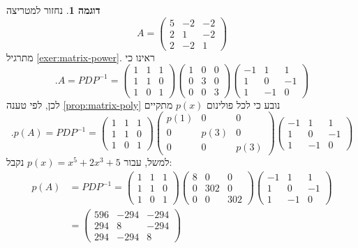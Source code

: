 \documentclass[12pt]{report}
\theoremstyle{plain}
\theoremstyle{definition}
\newtheorem{example}{דוגמה}[chapter]
\newcommand{\0}{\mathbf{0}}
\begin{document}
\begin{example}
נחזור למטריצה
$$
A=\begin{pmatrix}
5 & -2 & -2\\
2 & 1 & -2\\
2 & -2 & 1
\end{pmatrix}
$$
מתרגיל
\ref{exer:matrix-power}.
ראינו כי
$$
.A=PDP^{-1}=\begin{pmatrix}
1 & 1 & 1 \\ 
1 & 1 & 0 \\
1 & 0 & 1
\end{pmatrix}\begin{pmatrix}
1 & 0 & 0\\
0 & 3 & 0\\
0 & 0 & 3
\end{pmatrix}\begin{pmatrix}
-1 & 1 & 1\\
1 & 0 & -1\\
1 & -1 & 0
\end{pmatrix}
$$
לכן, לפי טענה
\ref{prop:matrix-poly}
נובע כי לכל פולינום
$p(x)$
מתקיים
$$
.p(A)=PDP^{-1}=\begin{pmatrix}
1 & 1 & 1 \\ 
1 & 1 & 0 \\
1 & 0 & 1
\end{pmatrix}\begin{pmatrix}
p(1) & 0 & 0\\
0 & p(3) & 0\\
0 & 0 & p(3)
\end{pmatrix}\begin{pmatrix}
-1 & 1 & 1\\
1 & 0 & -1\\
1 & -1 & 0
\end{pmatrix}
$$
למשל, עבור
$p(x)=x^5+2x^3+5$
נקבל:
$$
\begin{aligned}
p(A)&=PDP^{-1}=\begin{pmatrix}
1 & 1 & 1 \\ 
1 & 1 & 0 \\
1 & 0 & 1
\end{pmatrix}\begin{pmatrix}
8 & 0 & 0\\
0 & 302 & 0\\
0 & 0 & 302
\end{pmatrix}\begin{pmatrix}
-1 & 1 & 1\\
1 & 0 & -1\\
1 & -1 & 0
\end{pmatrix} \\
&=\begin{pmatrix}
596 & -294 & -294\\
294 & 8 & -294\\
294 & -294 & 8
\end{pmatrix}
\end{aligned}
$$

\end{example}
\end{document}
